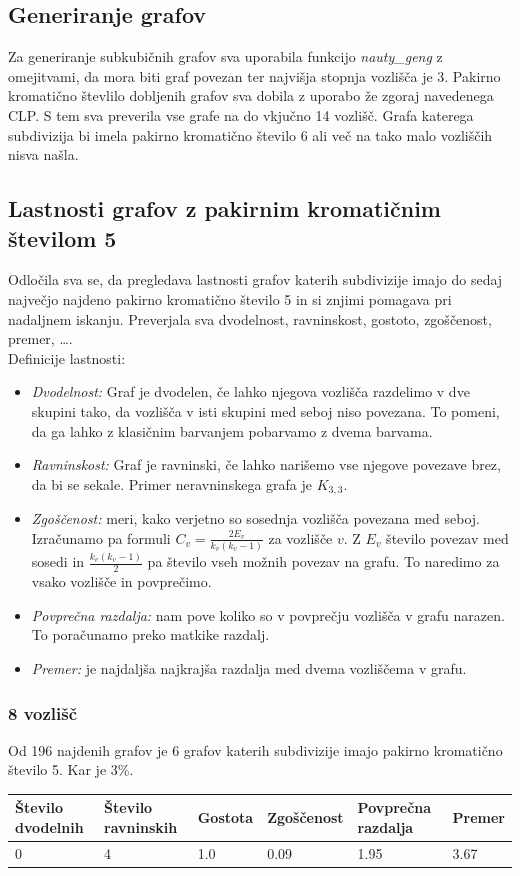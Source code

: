 \documentclass[11pt,a4paper,titlepage]{article}
\begin{document}
\subsection{Generiranje grafov}
Za generiranje subkubičnih grafov sva uporabila funkcijo \emph{nauty\_geng} z omejitvami, da mora biti graf povezan ter najvišja stopnja vozlišča je 3. Pakirno kromatično števlilo dobljenih grafov sva dobila z uporabo že zgoraj navedenega CLP. S tem sva preverila vse grafe na do vkjučno 14 vozlišč. Grafa katerega subdivizija bi imela pakirno kromatično število 6 ali več na tako malo vozliščih nisva našla.

\subsection{Lastnosti grafov z pakirnim kromatičnim številom 5}
Odločila sva se, da pregledava lastnosti grafov katerih subdivizije imajo do sedaj največjo najdeno pakirno kromatično število 5 in si znjimi pomagava pri nadaljnem iskanju. Preverjala sva dvodelnost, ravninskost, gostoto, zgoščenost, premer, \dots.\\
Definicije lastnosti:
\begin{itemize}
	\item \emph{Dvodelnost:} Graf je dvodelen, če lahko njegova vozlišča razdelimo v dve skupini tako, da vozlišča v isti skupini med seboj niso povezana. To pomeni, da ga lahko z klasičnim barvanjem pobarvamo z dvema barvama.
	\item  \emph{Ravninskost:} Graf je ravninski, če lahko narišemo vse njegove povezave brez, da bi se sekale. Primer neravninskega grafa je $K_{3,3}$.
	\item  \emph{Zgoščenost:} meri, kako verjetno so sosednja vozlišča povezana med seboj. Izračunamo pa formuli $C_v = \frac{2E_v}{k_v(k_v-1)}$ za vozlišče $v$. Z $E_v$ število povezav med sosedi in $\frac{k_v(k_v-1)}{2}$ pa število vseh možnih povezav na grafu. To naredimo za vsako vozlišče in povprečimo.
	\item \emph{Povprečna razdalja:} nam pove koliko so v povprečju vozlišča v grafu narazen. To poračunamo preko matkike razdalj.
	\item  \emph{Premer:} je najdaljša najkrajša razdalja med dvema vozliščema v grafu. 
\end{itemize}



\subsubsection{8 vozlišč}
Od 196 najdenih grafov je 6 grafov katerih subdivizije imajo pakirno kromatično število 5. Kar je 3\%. 
\begin{table}[H]
	\begin{tabular}{|l|l|l|l|l|l|}
		\hline
		Število dvodelnih	& Število ravninskih  & Gostota  & Zgoščenost & Povprečna razdalja & Premer \\ \hline
		0 & 4 & 1.0 & 0.09 & 1.95 & 3.67  \\ \hline
	\end{tabular}
\end{table}
\end{document}
